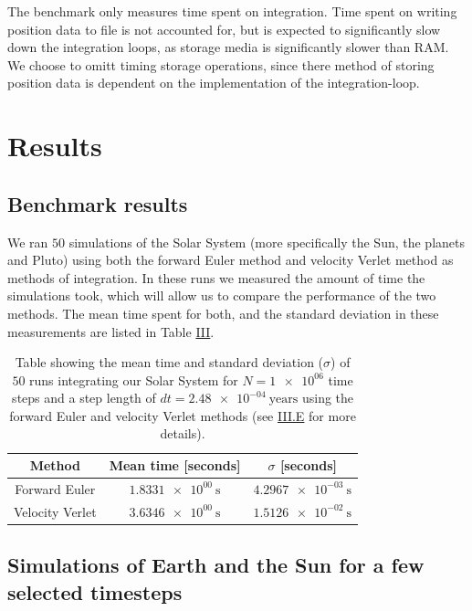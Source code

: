 \documentclass[reprint,english,notitlepage]{revtex4-1}  %
\begin{document}
The benchmark only measures time spent on integration. Time spent on writing position data to file is not accounted for, but is expected to significantly slow down the integration loops, as storage media is significantly slower than RAM. We choose to omitt timing storage operations, since there method of storing position data is dependent on the implementation of the integration-loop.

\newpage

\section{Results} \label{sec:IV}

\subsection{Benchmark results} \label{sec:IV:a}

We ran $50$ simulations of the Solar System (more specifically the Sun, the planets and Pluto) using both the forward Euler method and velocity Verlet method as methods of integration. In these runs we measured the amount of time the simulations took, which will allow us to compare the performance of the two methods. The mean time spent for both, and the standard deviation in these measurements are listed in Table \hyperref[table:benchmark]{III}.

\begin{table}[H]
\caption{Table showing the mean time and standard deviation ($\sigma$) of \(50\) runs integrating our Solar System for \(N = \num{1e+06}\) time steps and a step length of \(dt = \SI{2.48e-04}{\text{years}}\) using the forward Euler and velocity Verlet methods (see \hyperref[sec:III:e]{III.E} for more details).}
\begin{tabular}{|c|c|c|}
\hline
Method & Mean time [seconds] & $\sigma$ [seconds] \\
\hline
Forward Euler & \(\SI{1.8331e+00}{\second}\) & \(\SI{4.2967e-03}{\second}\) \\
Velocity Verlet &  \(\SI{3.6346e+00}{\second}\) & \(\SI{1.5126e-02}{\second}\)\\
\hline
\end{tabular}
\label{table:benchmark}
\end{table}

\subsection{Simulations of Earth and the Sun for a few selected timesteps} \label{sec:IV:b}
\end{document}
